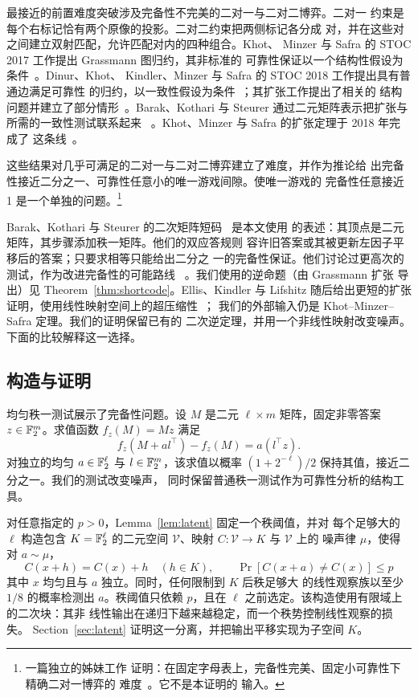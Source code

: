 最接近的前置难度突破涉及完备性不完美的二对一与二对二博弈。二对一
约束是每个右标记恰有两个原像的投影。二对二约束把两侧标记各分成
对，并在这些对之间建立双射匹配，允许匹配对内的四种组合。Khot、
Minzer 与 Safra 的 STOC 2017 工作提出 Grassmann 图归约，其非标准的
可靠性保证以一个结构性假设为条件~\cite{KMS17}。Dinur、Khot、
Kindler、Minzer 与 Safra 的 STOC 2018 工作提出具有普通边满足可靠性
的归约，以一致性假设为条件~\cite{DKKMS25}；其扩张工作提出了相关的
结构问题并建立了部分情形~\cite{DKKMS21Expansion}。Barak、Kothari
与 Steurer 通过二元矩阵表示把扩张与所需的一致性测试联系起来
~\cite{BKS18}。Khot、Minzer 与 Safra 的扩张定理于 2018 年完成了
这条线~\cite{KMS23}。

这些结果对几乎可满足的二对一与二对二博弈建立了难度，并作为推论给
出完备性接近二分之一、可靠性任意小的唯一游戏间隙。使唯一游戏的
完备性任意接近 1 是一个单独的问题。\footnote{一篇独立的姊妹工作
证明：在固定字母表上，完备性完美、固定小可靠性下精确二对一博弈的
难度~\cite[Theorem~1.1]{OpenAIPerfectTwoToOne2026}。它不是本证明的
输入。}

Barak、Kothari 与 Steurer 的二次矩阵短码~\cite{BKS18} 是本文使用
的表述：其顶点是二元矩阵，其步骤添加秩一矩阵。他们的双应答规则
容许旧答案或其被更新左因子平移后的答案；只要求相等只能给出二分之
一的完备性保证。他们讨论过更高次的测试，作为改进完备性的可能路线
~\cite[Section~1.6]{BKS18}。我们使用的逆命题（由 Grassmann 扩张
导出）见 Theorem~\ref{thm:shortcode}。Ellis、Kindler 与 Lifshitz
随后给出更短的扩张证明，使用线性映射空间上的超压缩性~\cite{EKL26}；
我们的外部输入仍是 Khot--Minzer--Safra 定理。我们的证明保留已有的
二次逆定理，并用一个非线性映射改变噪声。下面的比较解释这一选择。

\subsection{构造与证明}

均匀秩一测试展示了完备性问题。设 \(M\) 是二元 \(\ell\times m\)
矩阵，固定非零答案 \(z\in\mathbb F_2^m\)。求值函数 \(f_z(M)=Mz\) 满足
\[
 f_z(M+a l^\top)-f_z(M)=a(l^\top z).
\]
对独立的均匀 \(a\in\mathbb F_2^\ell\) 与 \(l\in\mathbb F_2^m\)，该求值以概率
\((1+2^{-\ell})/2\) 保持其值，接近二分之一。我们的测试改变噪声，
同时保留普通秩一测试作为可靠性分析的结构工具。

对任意指定的 \(p>0\)，Lemma~\ref{lem:latent} 固定一个秩阈值，并对
每个足够大的 \(\ell\) 构造包含 \(K=\mathbb F_2^\ell\) 的二元空间
\(\mathcal V\)、映射 \(C:\mathcal V\to K\) 与 \(\mathcal V\) 上的
噪声律 \(\mu\)，使得对 \(a\sim\mu\)，
\[
 C(x+h)=C(x)+h\quad(h\in K),\qquad
 \Pr[C(x+a)\ne C(x)]\le p
\]
其中 \(x\) 均匀且与 \(a\) 独立。同时，任何限制到 \(K\) 后秩足够大
的线性观察族以至少 \(1/8\) 的概率检测出 \(a\)。秩阈值只依赖
\(p\)，且在 \(\ell\) 之前选定。该构造使用有限域上的二次块：其非
线性输出在递归下越来越稳定，而一个秩势控制线性观察的损失。
Section~\ref{sec:latent} 证明这一分离，并把输出平移实现为子空间
\(K\)。

